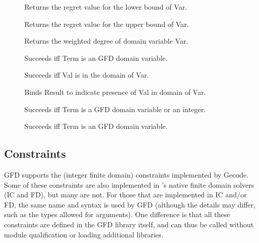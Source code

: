 \begin{description}
\item[]
Returns the regret value for the lower bound of Var.

\item[]
Returns the regret value for the upper bound of Var.

\item[]
Returns the weighted degree of domain variable Var.

\item[]
Succeeds iff Term is an GFD domain variable.

\item[]
Succeeds iff Val is in the domain of Var.

\item[]
Binds Result to indicate presence of Val in domain of Var.

\item[]
Succeeds iff Term is a GFD domain variable or an integer.

\item[]
Succeeds iff Term is an GFD domain variable.

\end{description}

\subsection{Constraints}

GFD supports the (integer finite domain) constraints implemented by Gecode.
Some of these constraints are also implemented in \eclipse's native finite 
domain solvers (IC and FD), but many are not. For those that are 
implemented in IC and/or FD, the same name and syntax is used by GFD 
(although the details may differ, such as the types allowed for arguments).  
One difference is that all these constraints are defined in the GFD
library itself, and can thus be called without module qualification or
loading additional libraries. 

